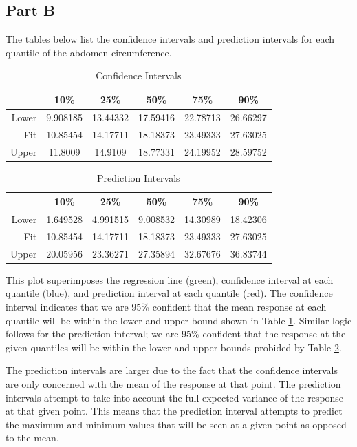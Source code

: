 \documentclass[a4paper, 11pt]{article}
\begin{document}
\subsection*{Part B}
The tables below list the confidence intervals and prediction intervals for each quantile of the abdomen circumference.

\begin{table}[H]
	\centering
	\begin{tabular}{r | c | c | c | c | c}
	   & 10\% & 25\% & 50\% & 75\% & 90\% \\ \hline
	 Lower & 9.908185 & 13.44332 & 17.59416 & 22.78713 & 26.66297 \\
	 Fit &10.85454 & 14.17711 &  18.18373 &  23.49333 &  27.63025 \\
	 Upper & 11.8009 & 14.9109 & 18.77331 & 24.19952 & 28.59752 \\
	\end{tabular}
	\caption{Confidence Intervals}
	\label{table:CI}
\end{table}

\begin{table}[H]
	\centering
	\begin{tabular}{r | c | c | c | c | c}
	   & 10\% & 25\% & 50\% & 75\% & 90\% \\ \hline
	 Lower & 1.649528 & 4.991515 & 9.008532 & 14.30989 & 18.42306 \\
	 Fit &10.85454 & 14.17711 &  18.18373 &  23.49333 &  27.63025 \\
	 Upper & 20.05956 & 23.36271 & 27.35894 & 32.67676 & 36.83744 
	\end{tabular}
	\caption{Prediction Intervals}
	\label{table:PI}
\end{table}

This plot superimposes the regression line (green), confidence interval at each quantile (blue), and prediction interval at each quantile (red). The confidence interval indicates that we are 95\% confident that the mean response at each quantile will be within the lower and upper bound shown in Table \ref{table:CI}. Similar logic follows for the prediction interval; we are 95\% confident that the response at the given quantiles will be within the lower and upper bounds probided by Table \ref{table:PI}.

The prediction intervals are larger due to the fact that the confidence intervals are only concerned with the mean of the response at that point. The prediction intervals attempt to take into account the full expected variance of the response at that given point. This means that the prediction interval attempts to predict the maximum and minimum values that will be seen at a given point as opposed to the mean.
\end{document}
